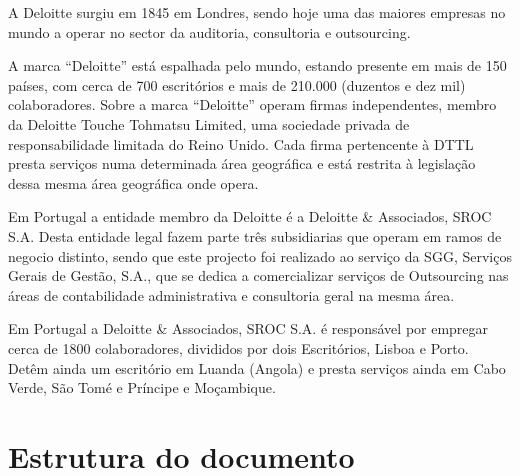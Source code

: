  A Deloitte surgiu em 1845 em Londres, sendo hoje uma das maiores empresas no mundo a operar no sector da auditoria, consultoria e outsourcing.
\par A marca “Deloitte” está espalhada pelo mundo, estando presente em mais de 150 países, com cerca de 700 escritórios e mais de 210.000 (duzentos e dez mil) colaboradores. Sobre a marca “Deloitte” operam firmas independentes, membro da Deloitte Touche Tohmatsu Limited, uma sociedade privada de responsabilidade limitada do Reino Unido. Cada firma pertencente à DTTL presta serviços numa determinada área geográfica e está restrita à legislação dessa mesma área geográfica onde opera.
\par Em Portugal a entidade membro da Deloitte é a Deloitte \& Associados, SROC S.A. Desta entidade legal fazem parte três subsidiarias que operam em ramos de negocio distinto, sendo que este projecto foi realizado ao serviço da SGG, Serviços Gerais de Gestão, S.A., que se dedica a comercializar serviços de Outsourcing nas áreas de contabilidade administrativa e consultoria geral na mesma área.
\par Em Portugal a Deloitte \& Associados, SROC S.A. é responsável por empregar cerca de 1800 colaboradores, divididos por dois Escritórios, Lisboa e Porto. Detêm ainda um escritório em Luanda (Angola) e presta serviços ainda em Cabo Verde, São Tomé e Príncipe e Moçambique.

\section{Estrutura do documento}

